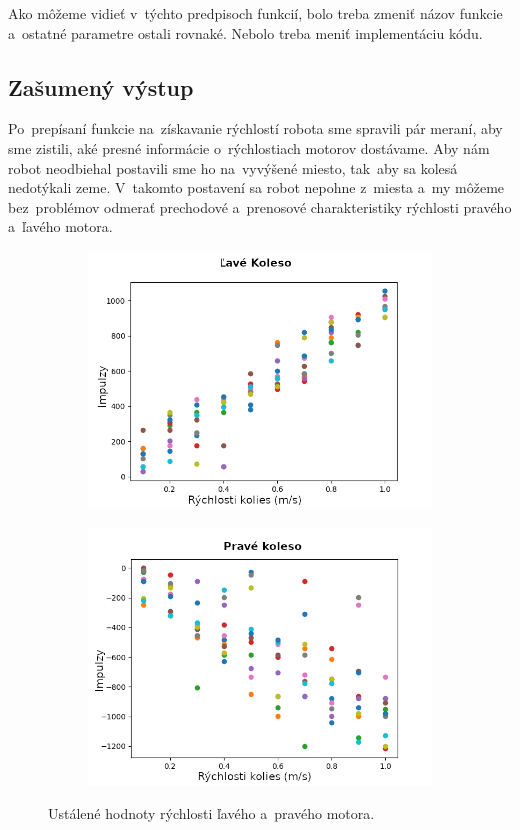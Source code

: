 \noindent Ako môžeme vidieť v~týchto predpisoch funkcií, bolo treba zmeniť názov funkcie a~ostatné parametre ostali rovnaké.
Nebolo treba meniť implementáciu kódu.

\subsection{Zašumený výstup}

Po~prepísaní funkcie na~získavanie rýchlostí robota sme spravili pár meraní, aby sme zistili, aké presné informácie o~rýchlostiach
motorov dostávame. Aby nám robot neodbiehal postavili sme ho na~vyvýšené miesto, tak~aby sa kolesá nedotýkali zeme. V~takomto
postavení sa robot nepohne z~miesta a~my môžeme bez~problémov odmerať prechodové a~prenosové charakteristiky rýchlosti pravého
a~ľavého motora.

\begin{figure}[!htbp]
	\begin{subfigure}{0.5\textwidth}
		\includegraphics[width=\textwidth]{img/Left_wheel_2.png}
	\end{subfigure}
	\hfill
	\begin{subfigure}{0.5\textwidth}
		\includegraphics[width=\textwidth]{img/Right_wheel_2.png}
	\end{subfigure}
	\caption{Ustálené hodnoty rýchlosti ľavého a~pravého motora. }
	\label{fig:lavePraveKoleso}
\end{figure}

